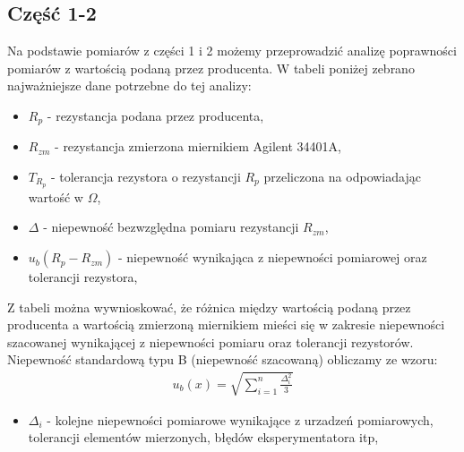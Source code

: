 \documentclass[11pt]{article}
\begin{document}
    \subsection*{Część 1-2}
    Na podstawie pomiarów z części 1 i 2 możemy przeprowadzić analizę
    poprawności pomiarów z wartością podaną przez producenta. W tabeli
    poniżej zebrano najważniejsze dane potrzebne do tej analizy:
    \begin{center}
    \end{center}
    {\footnotesize
        \begin{itemize}
            \setlength\itemsep{0em}
            \item[] \boldmath$R_p$ - rezystancja podana przez producenta,
            \item[] \boldmath$R_{zm}$ - rezystancja zmierzona miernikiem Agilent 34401A,
            \item[] \boldmath$T_{R_p}$ - tolerancja rezystora o rezystancji $R_p$ przeliczona na odpowiadając wartość w $\Omega$,
            \item[] \boldmath$\Delta$ - niepewność bezwzględna pomiaru rezystancji $R_{zm}$,
            \item[] \boldmath$u_b(R_p-R_{zm})$ - niepewność wynikająca z niepewności pomiarowej oraz tolerancji rezystora,
        \end{itemize}}
    Z tabeli można wywnioskować, że różnica między wartością podaną przez
    producenta a wartością zmierzoną miernikiem mieści się w zakresie
    niepewności szacowanej wynikającej z niepewności pomiaru oraz tolerancji rezystorów.\\
    Niepewność standardową typu B (niepewność szacowaną) obliczamy ze wzoru:
    \begin{gather*}
        u_b(x)=\sqrt{\sum_{i=1}^{n} \frac{\Delta_i^2}{3}}
    \end{gather*}
    {\footnotesize
        \begin{itemize}
            \setlength\itemsep{0em}
            \item[] \boldmath$\Delta_i$ - kolejne niepewności pomiarowe wynikające z urzadzeń pomiarowych, tolerancji elementów mierzonych, błędów eksperymentatora itp,
        \end{itemize}}
\end{document}
